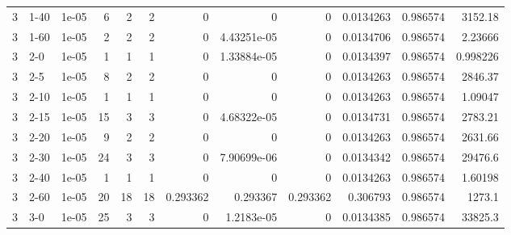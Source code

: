 \begin{tabular}{rlrrrrrrrrrr}
     3 & 1-40   &      1e-05 &           6 &                 2 &                 2 &     0           &     0           &      0           &        0.0134263 &               0.986574 &        3152.18     \\
     3 & 1-60   &      1e-05 &           2 &                 2 &                 2 &     0           &     4.43251e-05 &      0           &        0.0134706 &               0.986574 &           2.23666  \\
     3 & 2-0    &      1e-05 &           1 &                 1 &                 1 &     0           &     1.33884e-05 &      0           &        0.0134397 &               0.986574 &           0.998226 \\
     3 & 2-5    &      1e-05 &           8 &                 2 &                 2 &     0           &     0           &      0           &        0.0134263 &               0.986574 &        2846.37     \\
     3 & 2-10   &      1e-05 &           1 &                 1 &                 1 &     0           &     0           &      0           &        0.0134263 &               0.986574 &           1.09047  \\
     3 & 2-15   &      1e-05 &          15 &                 3 &                 3 &     0           &     4.68322e-05 &      0           &        0.0134731 &               0.986574 &        2783.21     \\
     3 & 2-20   &      1e-05 &           9 &                 2 &                 2 &     0           &     0           &      0           &        0.0134263 &               0.986574 &        2631.66     \\
     3 & 2-30   &      1e-05 &          24 &                 3 &                 3 &     0           &     7.90699e-06 &      0           &        0.0134342 &               0.986574 &       29476.6      \\
     3 & 2-40   &      1e-05 &           1 &                 1 &                 1 &     0           &     0           &      0           &        0.0134263 &               0.986574 &           1.60198  \\
     3 & 2-60   &      1e-05 &          20 &                18 &                18 &     0.293362    &     0.293367    &      0.293362    &        0.306793  &               0.986574 &        1273.1      \\
     3 & 3-0    &      1e-05 &          25 &                 3 &                 3 &     0           &     1.2183e-05  &      0           &        0.0134385 &               0.986574 &       33825.3      \\

\end{tabular}
